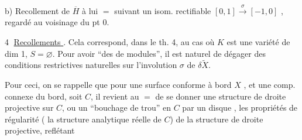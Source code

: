 b) Recollement de $\overline H$ à lui $=$ suivant
un isom. rectifiable $[0,1]\xrightarrow{\sigma}[-1,0]$ ,
regardé au voisinage du pt 0.


\textcircled{4} \uline{Recollements }.
Cela correspond,
dans le th. 4, au cas où $K$ est une
variété  de dim 1, $S=\varnothing$.  Pour avoir
``des  de modules'', il est naturel
de dégager des conditions restrictives
naturelles sur l'involution $\sigma$ de
$\delta\widetilde X$.

Pour ceci,  on se rappelle que
pour une surface conforme à bord $X$
, et une comp. connexe du bord, soit $C$,
il revient au $=$ de se donner une
structure de droite projective  sur $C$,
ou un ``bouchage de trou'' en $C$
par un disque , les propriétés de régularité
( la structure analytique réelle de $C$)
de la structure de droite projective, reflétant
